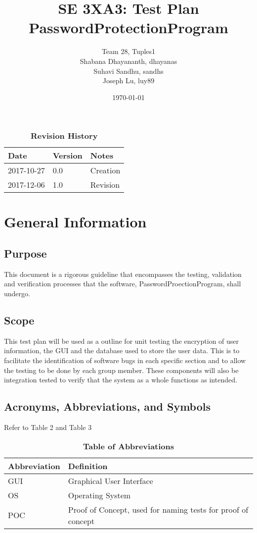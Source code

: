 \documentclass[12pt, titlepage]{article}
\title{SE 3XA3: Test Plan\\PasswordProtectionProgram}
\author{Team 28, Tuples1
		\\ Shabana Dhayananth, dhayanas
		\\ Suhavi Sandhu, sandhs
		\\ Joseph Lu, luy89
}
\date{\today}
\begin{document}
\maketitle

\tableofcontents
\listoftables


\begin{table}[bp]
\caption{\bf Revision History}
\begin{tabularx}{\textwidth}{p{3cm}p{2cm}X}
\toprule {\bf Date} & {\bf Version} & {\bf Notes}\\
\midrule
2017-10-27 & 0.0 & Creation\\
2017-12-06 & 1.0 & Revision\\
\bottomrule
\end{tabularx}
\end{table}

\newpage


\section{General Information}

\subsection{Purpose}
This document is a rigorous guideline that encompasses the testing, validation and verification processes that the software, PasswordProectionProgram, shall undergo.

\subsection{Scope}
This test plan will be used as a outline for unit testing the encryption of user information, the GUI and the database used to store the user data. This is to facilitate the identification of software bugs in each specific section and to allow the testing to be done by each group member. These components will also be integration tested to verify that the system as a whole functions as intended.


\subsection{Acronyms, Abbreviations, and Symbols}
Refer to Table 2 and Table 3
	
\begin{table}[hbp]
\caption{\textbf{Table of Abbreviations}} \label{0Table}

    \begin{tabularx}{\textwidth}{p{3cm}X}
        \toprule
        \textbf{Abbreviation} & \textbf{Definition} \\
        \midrule
        GUI & Graphical User Interface\\\hline
        OS & Operating System\\\hline
        POC & Proof of Concept, used for naming tests for proof of concept\\
        \bottomrule
    \end{tabularx}

\end{table}
\end{document}
